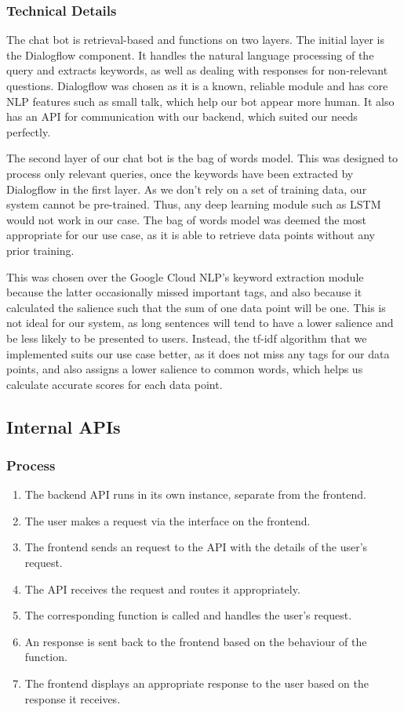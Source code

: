 \subsubsection{Technical Details}
The chat bot is retrieval-based and functions on two layers. The initial layer is the Dialogflow component. It handles the natural language processing of the query and extracts keywords, as well as dealing with responses for non-relevant questions. Dialogflow was chosen as it is a known, reliable module and has core NLP features such as small talk, which help our bot appear more human. It also has an API for communication with our backend, which suited our needs perfectly.

The second layer of our chat bot is the bag of words model. This was designed to process only relevant queries, once the keywords have been extracted by Dialogflow in the first layer. As we don't rely on a set of training data, our system cannot be pre-trained. Thus, any deep learning module such as LSTM would not work in our case. The bag of words model was deemed the most appropriate for our use case, as it is able to retrieve data points without any prior training.

This was chosen over the Google Cloud NLP's keyword extraction module because the latter occasionally missed important tags, and also because it calculated the salience such that the sum of one data point will be one. This is not ideal for our system, as long sentences will tend to have a lower salience and be less likely to be presented to users. Instead, the tf-idf algorithm that we implemented suits our use case better, as it does not miss any tags for our data points, and also assigns a lower salience to common words, which helps us calculate accurate scores for each data point.

\subsection{Internal APIs}
\subsubsection{Process}
\begin{enumerate}
    \item{The backend API runs in its own instance, separate from the frontend.}
    \item{The user makes a request via the interface on the frontend.}
    \item{The frontend sends an  request to the API with the details of the user's request.}
    \item{The API receives the request and routes it appropriately.}
    \item{The corresponding function is called and handles the user's request.}
    \item{An  response is sent back to the frontend based on the behaviour of the function.}
    \item{The frontend displays an appropriate response to the user based on the response it receives.}
\end{enumerate}

